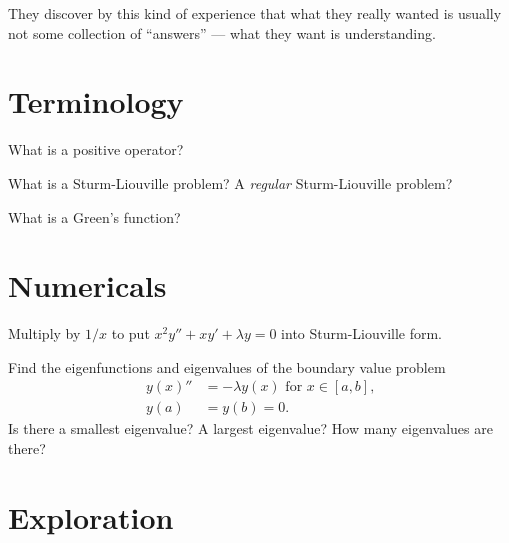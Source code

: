 \documentclass{homework}
\author{Jim Fowler}
\begin{document}
\maketitle

\begin{inspiration}
They discover by this kind of experience that what they really wanted is usually not some collection of ``answers'' --- what they want is understanding.
\end{inspiration}

\section{Terminology}

\begin{problem}
  What is a positive operator?
\end{problem}

\begin{problem}
  What is a Sturm-Liouville problem?  A \textit{regular} Sturm-Liouville problem?
\end{problem}

\begin{problem}
  What is a Green's function?
\end{problem}

\section{Numericals}

\begin{problem}
  Multiply by $1/x$ to put $x^2 y'' + xy' + \lambda y = 0$  into Sturm-Liouville form.
\end{problem}

\begin{problem}\label{wave-with-fixed-endpoints}Find the eigenfunctions and eigenvalues of the boundary value problem
  \begin{align*}
    y(x)'' &= - \lambda y(x) \mbox{ for $x \in [a,b]$,} \\
    y(a) &= y(b) = 0.
  \end{align*}
  Is there a smallest eigenvalue?  A largest eigenvalue?  How many
  eigenvalues are there?
\end{problem}

\section{Exploration}
\end{document}

